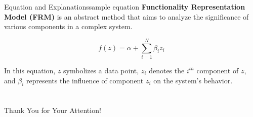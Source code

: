 \documentclass[
]{beamer}
\begin{document}
\begin{frame}{Equation and Explanations}{sample equation}
\textbf{Functionality Representation Model (FRM)} is an abstract method that aims to analyze the significance of various components in a complex system.

$$f(z) = \alpha + \sum^{N}_{i=1}\beta_iz_i$$

In this equation, $z$ symbolizes a data point, $z_i$ denotes the $i^{th}$ component of $z$, and $\beta_i$ represents the influence of component $z_i$ on the system's behavior.
    
\end{frame}

\section{\bibname}
\begin{frame}[t, allowframebreaks]{\bibname}
\printbibliography[heading=none]
\end{frame}




\begin{frame}%
\vfill
\centerline{Thank You for Your Attention!}
\vfill\vfill
\end{frame}
%
\end{document}
